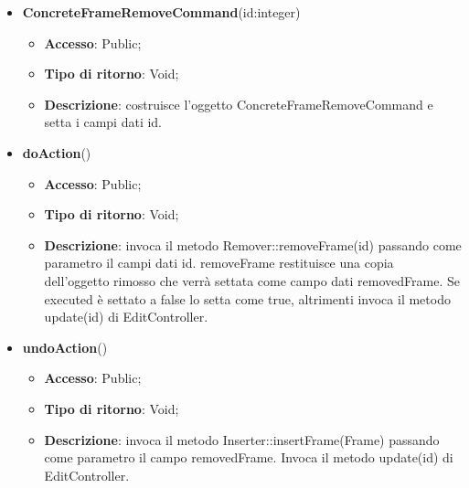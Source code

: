 {{{	
	\begin{itemize}
		\item \textbf{ConcreteFrameRemoveCommand}(id:integer)
		\begin{itemize}
			\item \textbf{Accesso}: Public;
			\item \textbf{Tipo di ritorno}: Void;
			\item \textbf{Descrizione}: costruisce l’oggetto ConcreteFrameRemoveCommand e setta i campi dati id.
		\end{itemize}
		\item \textbf{doAction}()
		\begin{itemize}
			\item \textbf{Accesso}: Public;
			\item \textbf{Tipo di ritorno}: Void;
			\item \textbf{Descrizione}: invoca il metodo Remover::removeFrame(id) passando come parametro il  campi dati id. removeFrame restituisce una copia dell’oggetto rimosso che verrà settata come campo dati removedFrame. Se executed è settato a false lo setta come true, altrimenti invoca il metodo update(id) di EditController.
		\end{itemize}
		\item \textbf{undoAction}()
		\begin{itemize}
			\item \textbf{Accesso}: Public;
			\item \textbf{Tipo di ritorno}: Void;
			\item \textbf{Descrizione}: invoca il metodo Inserter::insertFrame(Frame) passando come parametro il campo removedFrame. Invoca il metodo update(id) di EditController.
		\end{itemize}
	\end{itemize}
	}
}}
